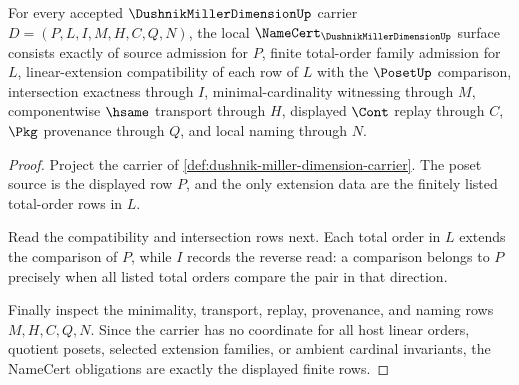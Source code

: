 \begin{theorem}
\label{thm:dushnik-miller-dimension-namecert-obligations}
For every accepted $\DushnikMillerDimensionUp$ carrier $D=(P,L,I,M,H,C,Q,N)$, the local $\NameCert_{\DushnikMillerDimensionUp}$ surface consists exactly of source admission for $P$, finite total-order family admission for $L$, linear-extension compatibility of each row of $L$ with the $\PosetUp$ comparison, intersection exactness through $I$, minimal-cardinality witnessing through $M$, componentwise $\hsame$ transport through $H$, displayed $\Cont$ replay through $C$, $\Pkg$ provenance through $Q$, and local naming through $N$.
\end{theorem}
\begin{proof}
Project the carrier of \autoref{def:dushnik-miller-dimension-carrier}. The poset source is the displayed row $P$, and the only extension data are the finitely listed total-order rows in $L$.

Read the compatibility and intersection rows next. Each total order in $L$ extends the comparison of $P$, while $I$ records the reverse read: a comparison belongs to $P$ precisely when all listed total orders compare the pair in that direction.

Finally inspect the minimality, transport, replay, provenance, and naming rows $M,H,C,Q,N$. Since the carrier has no coordinate for all host linear orders, quotient posets, selected extension families, or ambient cardinal invariants, the NameCert obligations are exactly the displayed finite rows.
\end{proof}

